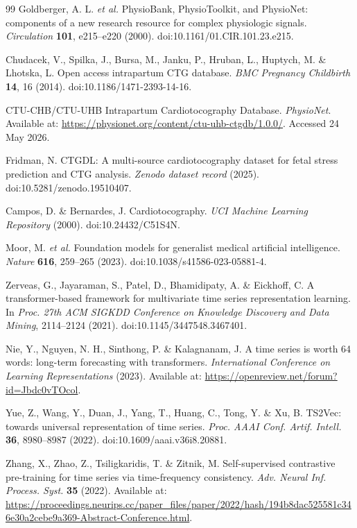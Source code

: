 \documentclass[11pt]{article}
\begin{document}
\begin{thebibliography}{99}
Goldberger, A. L. \textit{et al.}
PhysioBank, PhysioToolkit, and PhysioNet: components of a new research resource for complex physiologic signals.
\textit{Circulation} \textbf{101}, e215--e220 (2000).
doi:10.1161/01.CIR.101.23.e215.

Chudacek, V., Spilka, J., Bursa, M., Janku, P., Hruban, L., Huptych, M. \& Lhotska, L.
Open access intrapartum CTG database.
\textit{BMC Pregnancy Childbirth} \textbf{14}, 16 (2014).
doi:10.1186/1471-2393-14-16.

CTU-CHB/CTU-UHB Intrapartum Cardiotocography Database.
\textit{PhysioNet}.
Available at: \url{https://physionet.org/content/ctu-uhb-ctgdb/1.0.0/}.
Accessed 24 May 2026.

Fridman, N.
CTGDL: A multi-source cardiotocography dataset for fetal stress prediction and CTG analysis.
\textit{Zenodo dataset record} (2025).
doi:10.5281/zenodo.19510407.

Campos, D. \& Bernardes, J.
Cardiotocography.
\textit{UCI Machine Learning Repository} (2000).
doi:10.24432/C51S4N.

Moor, M. \textit{et al.}
Foundation models for generalist medical artificial intelligence.
\textit{Nature} \textbf{616}, 259--265 (2023).
doi:10.1038/s41586-023-05881-4.

Zerveas, G., Jayaraman, S., Patel, D., Bhamidipaty, A. \& Eickhoff, C.
A transformer-based framework for multivariate time series representation learning.
In \textit{Proc. 27th ACM SIGKDD Conference on Knowledge Discovery and Data Mining}, 2114--2124 (2021).
doi:10.1145/3447548.3467401.

Nie, Y., Nguyen, N. H., Sinthong, P. \& Kalagnanam, J.
A time series is worth 64 words: long-term forecasting with transformers.
\textit{International Conference on Learning Representations} (2023).
Available at: \url{https://openreview.net/forum?id=Jbdc0vTOcol}.

Yue, Z., Wang, Y., Duan, J., Yang, T., Huang, C., Tong, Y. \& Xu, B.
TS2Vec: towards universal representation of time series.
\textit{Proc. AAAI Conf. Artif. Intell.} \textbf{36}, 8980--8987 (2022).
doi:10.1609/aaai.v36i8.20881.

Zhang, X., Zhao, Z., Tsiligkaridis, T. \& Zitnik, M.
Self-supervised contrastive pre-training for time series via time-frequency consistency.
\textit{Adv. Neural Inf. Process. Syst.} \textbf{35} (2022).
Available at: \url{https://proceedings.neurips.cc/paper_files/paper/2022/hash/194b8dac525581c346e30a2cebe9a369-Abstract-Conference.html}.


\end{thebibliography}
\end{document}
